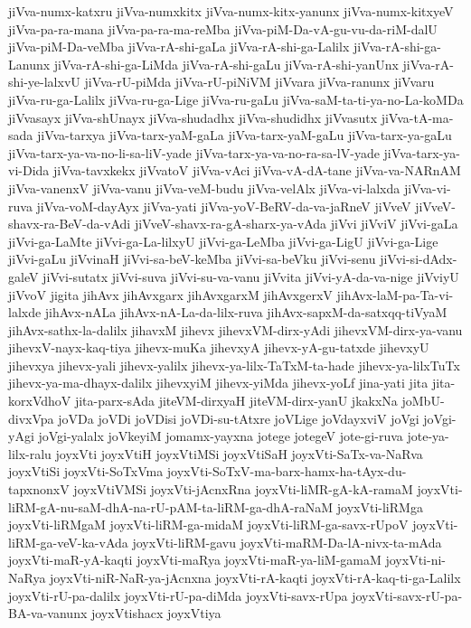 {jiVva-numx-katxru
jiVva-numxkitx
jiVva-numx-kitx-yanunx
jiVva-numx-kitxyeV
jiVva-pa-ra-mana
jiVva-pa-ra-ma-reMba
jiVva-piM-Da-vA-gu-vu-da-riM-dalU
jiVva-piM-Da-veMba
jiVva-rA-shi-gaLa
jiVva-rA-shi-ga-Lalilx
jiVva-rA-shi-ga-Lanunx
jiVva-rA-shi-ga-LiMda
jiVva-rA-shi-gaLu
jiVva-rA-shi-yanUnx
jiVva-rA-shi-ye-lalxvU
jiVva-rU-piMda
jiVva-rU-piNiVM
jiVvara
jiVva-ranunx
jiVvaru
jiVva-ru-ga-Lalilx
jiVva-ru-ga-Lige
jiVva-ru-gaLu
jiVva-saM-ta-ti-ya-no-La-koMDa
jiVvasayx
jiVva-shUnayx
jiVva-shudadhx
jiVva-shudidhx
jiVvasutx
jiVva-tA-ma-sada
jiVva-tarxya
jiVva-tarx-yaM-gaLa
jiVva-tarx-yaM-gaLu
jiVva-tarx-ya-gaLu
jiVva-tarx-ya-va-no-li-sa-liV-yade
jiVva-tarx-ya-va-no-ra-sa-lV-yade
jiVva-tarx-ya-vi-Dida
jiVva-tavxkekx
jiVvatoV
jiVva-vAci
jiVva-vA-dA-tane
jiVva-va-NARnAM
jiVva-vanenxV
jiVva-vanu
jiVva-veM-budu
jiVva-velAlx
jiVva-vi-lalxda
jiVva-vi-ruva
jiVva-voM-dayAyx
jiVva-yati
jiVva-yoV-BeRV-da-va-jaRneV
jiVveV
jiVveV-shavx-ra-BeV-da-vAdi
jiVveV-shavx-ra-gA-sharx-ya-vAda
jiVvi
jiVviV
jiVvi-gaLa
jiVvi-ga-LaMte
jiVvi-ga-La-lilxyU
jiVvi-ga-LeMba
jiVvi-ga-LigU
jiVvi-ga-Lige
jiVvi-gaLu
jiVvinaH
jiVvi-sa-beV-keMba
jiVvi-sa-beVku
jiVvi-senu
jiVvi-si-dAdx-galeV
jiVvi-sutatx
jiVvi-suva
jiVvi-su-va-vanu
jiVvita
jiVvi-yA-da-va-nige
jiVviyU
jiVvoV
jigita
jihAvx
jihAvxgarx
jihAvxgarxM
jihAvxgerxV
jihAvx-laM-pa-Ta-vi-lalxde
jihAvx-nALa
jihAvx-nA-La-da-lilx-ruva
jihAvx-sapxM-da-satxqq-tiVyaM
jihAvx-sathx-la-dalilx
jihavxM
jihevx
jihevxVM-dirx-yAdi
jihevxVM-dirx-ya-vanu
jihevxV-nayx-kaq-tiya
jihevx-muKa
jihevxyA
jihevx-yA-gu-tatxde
jihevxyU
jihevxya
jihevx-yali
jihevx-yalilx
jihevx-ya-lilx-TaTxM-ta-hade
jihevx-ya-lilxTuTx
jihevx-ya-ma-dhayx-dalilx
jihevxyiM
jihevx-yiMda
jihevx-yoLf
jina-yati
jita
jita-korxVdhoV
jita-parx-sAda
jiteVM-dirxyaH
jiteVM-dirx-yanU
jkakxNa
joMbU-divxVpa
joVDa
joVDi
joVDisi
joVDi-su-tAtxre
joVLige
joVdayxviV
joVgi
joVgi-yAgi
joVgi-yalalx
joVkeyiM
jomamx-yayxna
jotege
jotegeV
jote-gi-ruva
jote-ya-lilx-ralu
joyxVti
joyxVtiH
joyxVtiMSi
joyxVtiSaH
joyxVti-SaTx-va-NaRva
joyxVtiSi
joyxVti-SoTxVma
joyxVti-SoTxV-ma-barx-hamx-ha-tAyx-du-tapxnonxV
joyxVtiVMSi
joyxVti-jAcnxRna
joyxVti-liMR-gA-kA-ramaM
joyxVti-liRM-gA-nu-saM-dhA-na-rU-pAM-ta-liRM-ga-dhA-raNaM
joyxVti-liRMga
joyxVti-liRMgaM
joyxVti-liRM-ga-midaM
joyxVti-liRM-ga-savx-rUpoV
joyxVti-liRM-ga-veV-ka-vAda
joyxVti-liRM-gavu
joyxVti-maRM-Da-lA-nivx-ta-mAda
joyxVti-maR-yA-kaqti
joyxVti-maRya
joyxVti-maR-ya-liM-gamaM
joyxVti-ni-NaRya
joyxVti-niR-NaR-ya-jAcnxna
joyxVti-rA-kaqti
joyxVti-rA-kaq-ti-ga-Lalilx
joyxVti-rU-pa-dalilx
joyxVti-rU-pa-diMda
joyxVti-savx-rUpa
joyxVti-savx-rU-pa-BA-va-vanunx
joyxVtishacx
joyxVtiya
}
